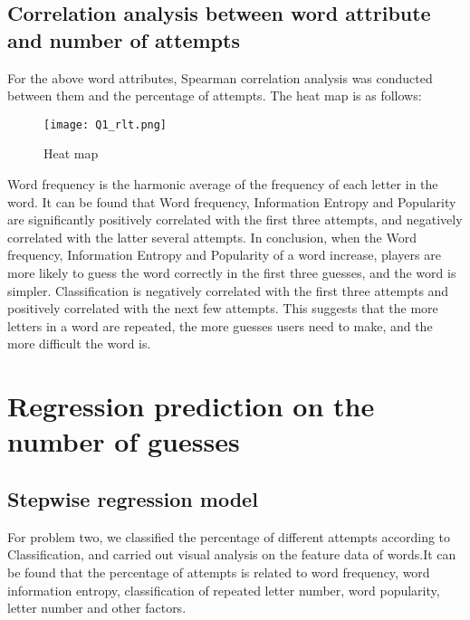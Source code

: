 \documentclass{mcmthesis}
\begin{document}
%


\subsection{Correlation analysis between word attribute and number of attempts}

For the above word attributes, Spearman correlation analysis was conducted between them and the percentage of attempts. The heat map is as follows:
\begin{figure}[H]
	\centering
	\texttt{[image: Q1\_rlt.png]}
	\caption{\small Heat map}
\end{figure}

Word frequency is the harmonic average of the frequency of each letter in the word.
It can be found that Word frequency, Information Entropy and Popularity are significantly positively correlated with the first three attempts, and negatively correlated with the latter several attempts. In conclusion, when the Word frequency, Information Entropy and Popularity of a word increase, players are more likely to guess the word correctly in the first three guesses, and the word is simpler.
Classification is negatively correlated with the first three attempts and positively correlated with the next few attempts. This suggests that the more letters in a word are repeated, the more guesses users need to make, and the more difficult the word is.

\section{Regression prediction on the number of guesses}
\subsection{Stepwise regression model}
For problem two, we classified the percentage of different attempts according to Classification, and carried out visual analysis on the feature data of words.It can be found that the percentage of attempts is related to word frequency, word information entropy, classification of repeated letter number, word popularity, letter number and other factors.
\end{document}
